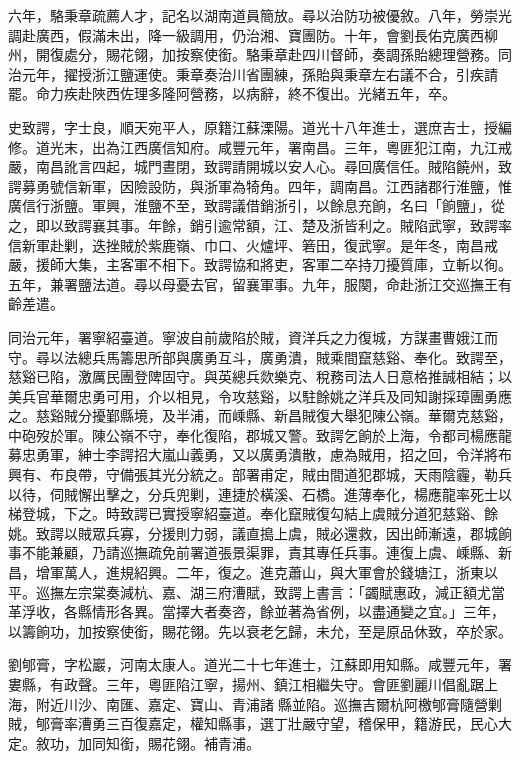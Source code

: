 \begin{pinyinscope}
六年，駱秉章疏薦人才，記名以湖南道員簡放。尋以治防功被優敘。八年，勞崇光調赴廣西，假滿未出，降一級調用，仍治湘、寶團防。十年，會劉長佑克廣西柳州，開復處分，賜花翎，加按察使銜。駱秉章赴四川督師，奏調孫貽總理營務。同治元年，擢授浙江鹽運使。秉章奏治川省團練，孫貽與秉章左右議不合，引疾請罷。命力疾赴陜西佐理多隆阿營務，以病辭，終不復出。光緒五年，卒。

史致諤，字士良，順天宛平人，原籍江蘇溧陽。道光十八年進士，選庶吉士，授編修。道光末，出為江西廣信知府。咸豐元年，署南昌。三年，粵匪犯江南，九江戒嚴，南昌訛言四起，城門晝閉，致諤請開城以安人心。尋回廣信任。賊陷饒州，致諤募勇號信新軍，因險設防，與浙軍為犄角。四年，調南昌。江西諸郡行淮鹽，惟廣信行浙鹽。軍興，淮鹽不至，致諤議借銷浙引，以餘息充餉，名曰「餉鹽」，從之，即以致諤襄其事。年餘，銷引逾常額，江、楚及浙皆利之。賊陷武寧，致諤率信新軍赴剿，迭挫賊於紫鹿嶺、巾口、火爐坪、箬田，復武寧。是年冬，南昌戒嚴，援師大集，主客軍不相下。致諤協和將吏，客軍二卒持刀擾質庫，立斬以徇。五年，兼署鹽法道。尋以母憂去官，留襄軍事。九年，服闋，命赴浙江交巡撫王有齡差遣。

同治元年，署寧紹臺道。寧波自前歲陷於賊，資洋兵之力復城，方謀畫曹娥江而守。尋以法總兵馬籌思所部與廣勇互斗，廣勇潰，賊乘間竄慈谿、奉化。致諤至，慈谿已陷，激厲民團登陴固守。與英總兵欻樂克、稅務司法人日意格推誠相結；以美兵官華爾忠勇可用，介以相見，令攻慈谿，以駐餘姚之洋兵及同知謝採璋團勇應之。慈谿賊分擾鄞縣境，及半浦，而嵊縣、新昌賊復大舉犯陳公嶺。華爾克慈谿，中砲歿於軍。陳公嶺不守，奉化復陷，郡城又警。致諤乞餉於上海，令都司楊應龍募忠勇軍，紳士李諤招大嵐山義勇，又以廣勇潰散，慮為賊用，招之回，令洋將布興有、布良帶，守備張其光分統之。部署甫定，賊由間道犯郡城，天雨陰霾，勒兵以待，伺賊懈出擊之，分兵兜剿，連捷於橫溪、石橋。進薄奉化，楊應龍率死士以梯登城，下之。時致諤已實授寧紹臺道。奉化竄賊復勾結上虞賊分道犯慈谿、餘姚。致諤以賊眾兵寡，分援則力弱，議直搗上虞，賊必還救，因出師漸遠，郡城餉事不能兼顧，乃請巡撫疏免前署道張景渠罪，責其專任兵事。連復上虞、嵊縣、新昌，增軍萬人，進規紹興。二年，復之。進克蕭山，與大軍會於錢塘江，浙東以平。巡撫左宗棠奏減杭、嘉、湖三府漕賦，致諤上書言：「蠲賦惠政，減正額尤當革浮收，各縣情形各異。當擇大者奏咨，餘並著為省例，以盡通變之宜。」三年，以籌餉功，加按察使銜，賜花翎。先以衰老乞歸，未允，至是原品休致，卒於家。

劉郇膏，字松巖，河南太康人。道光二十七年進士，江蘇即用知縣。咸豐元年，署婁縣，有政聲。三年，粵匪陷江寧，揚州、鎮江相繼失守。會匪劉麗川倡亂踞上海，附近川沙、南匯、嘉定、寶山、青浦諸縣並陷。巡撫吉爾杭阿檄郇膏隨營剿賊，郇膏率漕勇三百復嘉定，權知縣事，選丁壯嚴守望，稽保甲，籍游民，民心大定。敘功，加同知銜，賜花翎。補青浦。


\end{pinyinscope}
